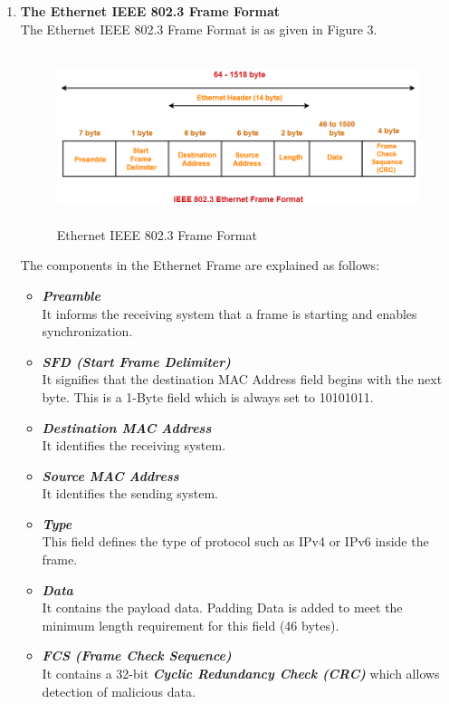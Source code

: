 \documentclass[12pt]{article}
\begin{document}
\begin{enumerate}
    \item \textbf{The Ethernet IEEE 802.3 Frame Format} \\
    The Ethernet IEEE 802.3 Frame Format is as given in Figure 3.
        \begin{figure}
            \centering
            \includegraphics[width=15cm, height=5cm]{ethernet_frame_802.3.png}
            \caption{Ethernet IEEE 802.3 Frame Format}
        \end{figure}
        
        The components in the Ethernet Frame are explained as follows:
        \begin{itemize}
            \item \textbf{\textit{Preamble}} \\
                It informs the receiving system that a frame is starting and enables synchronization.
            \item \textbf{\textit{SFD (Start Frame Delimiter)}} \\
                It signifies that the destination MAC Address field begins with the next byte. This is a 1-Byte field which is always set to 10101011.
            \item \textbf{\textit{Destination MAC Address}} \\
                It identifies the receiving system.
            \item \textbf{\textit{Source MAC Address}} \\
                It identifies the sending system.
            \item \textbf{\textit{Type}} \\
                This field defines the type of protocol such as IPv4 or IPv6 inside the frame.
            \item \textbf{\textit{Data}} \\
                It contains the payload data. Padding Data is added to meet the minimum length requirement for this field (46 bytes).
            \item \textbf{\textit{FCS (Frame Check Sequence)}} \\
                It contains a 32-bit \textbf{\textit{Cyclic Redundancy Check (CRC)}} which allows detection of malicious data.
        \end{itemize}

\end{enumerate}
\end{document}
